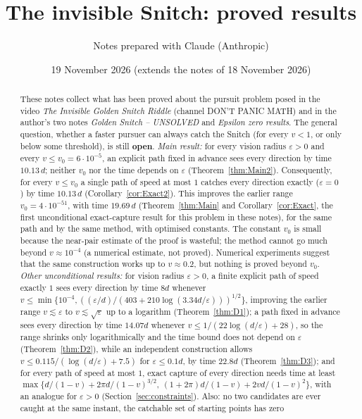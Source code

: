 \documentclass[11pt]{article}
\title{The invisible Snitch: proved results}
\author{Notes prepared with Claude (Anthropic)}
\date{19 November 2026 (extends the notes of 18 November 2026)}
\theoremstyle{remark}\newtheorem{remark}{Remark}
\begin{document}
\maketitle

\begin{abstract}
These notes collect what has been proved about the pursuit problem posed in the video
\emph{The Invisible Golden Snitch Riddle} (channel DON'T PANIC MATH) and in the author's two notes
\emph{Golden Snitch -- UNSOLVED} and \emph{Epsilon zero results}.
The general question, whether a faster pursuer can always catch the Snitch (for every $v<1$, or only below some threshold),
is still \textbf{open}.
\emph{Main result:} for every vision radius $\varepsilon>0$ and every $v\le v_0=6\cdot10^{-5}$, an explicit path fixed in
advance sees every direction by time $10.13\,d$; neither $v_0$ nor the time depends on $\varepsilon$
(Theorem~\ref{thm:Main2}). Consequently, for every $v\le v_0$ a single path of speed at most $1$ catches every direction exactly
($\varepsilon=0$) by time $10.13\,d$ (Corollary~\ref{cor:Exact2}). This improves the earlier range $v_0=4\cdot10^{-51}$, with time
$19.69\,d$ (Theorem~\ref{thm:Main} and Corollary~\ref{cor:Exact}, the first unconditional exact-capture result for this problem in
these notes), for the same path and by the same method, with optimised constants. The constant $v_0$ is small because the
near-pair estimate of the proof is wasteful; the method cannot go much beyond $v\approx10^{-4}$ (a numerical estimate, not
proved). Numerical experiments suggest that the same construction works up to $v\approx0.2$, but nothing is proved beyond $v_0$.
\emph{Other unconditional results:} for vision radius $\varepsilon>0$, a finite explicit path of speed exactly $1$ sees every
direction by time $8d$ whenever $v\le\min\{10^{-4},((\varepsilon/d)/(403+210\log(3.34d/\varepsilon)))^{1/2}\}$,
improving the earlier range $v\lesssim\varepsilon$ to $v\lesssim\sqrt{\varepsilon}$ up to a logarithm (Theorem~\ref{thm:D1}); a path fixed in
advance sees every direction by time $14.07d$ whenever $v\le1/(22\log(d/\varepsilon)+28)$, so the range shrinks only logarithmically
and the time bound does not depend on $\varepsilon$ (Theorem~\ref{thm:D2}), while an independent construction allows
$v\le0.115/(\log(d/\varepsilon)+7.5)$ for $\varepsilon\le0.1d$, by time $22.8d$ (Theorem~\ref{thm:D3}); and for every path of
speed at most $1$, exact capture of every direction needs time at least
$\max\{d/(1-v)+2\pi d/(1-v)^{3/2},\ (1+2\pi)d/(1-v)+2vd/(1-v)^2\}$, with an analogue for $\varepsilon>0$
(Section~\ref{sec:constraints}). Also: no two candidates are ever caught at the same instant, the catchable set of starting points has zero

\end{abstract}
\end{document}
